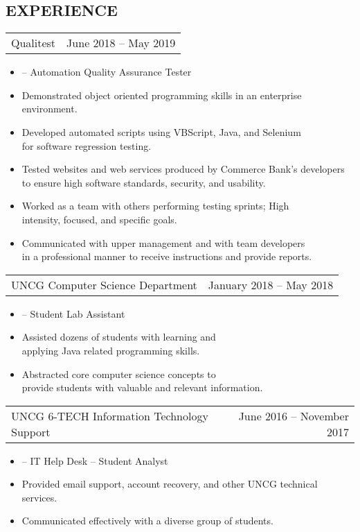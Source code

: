 \documentclass[overlapped,centered]{res}
\begin{document}
\begin{resume}
\section{EXPERIENCE}
		\begin{tabular}{p{3in}r}
		Qualitest & June 2018 -- May 2019
		\end{tabular}
		\begin{itemize}
		\item[] -- Automation Quality Assurance Tester
		\item[] Demonstrated object oriented programming skills in an enterprise \\ environment.
		\item[] Developed automated scripts using VBScript, Java, and Selenium \\ for software regression testing.
		\item[] Tested websites and web services produced by Commerce Bank's developers \\ to ensure high software standards, security, and usability.
		\item[] Worked as a team with others performing testing sprints; High \\ intensity, focused, and specific goals.
		\item[] Communicated with upper management and with team developers \\ in a professional manner to receive instructions and provide reports.
		\end{itemize}

		 \begin{tabular}{p{3in} r}
                  UNCG Computer Science Department &  January 2018 -- May 2018
                 \end{tabular}
		 \begin{itemize}
		\item[] -- Student Lab Assistant
                \item[] Assisted dozens of students with learning and \\ applying Java related programming skills.
		\item[] Abstracted core computer science concepts to \\ provide students with  valuable and relevant information.
                \end{itemize}

                \begin{tabular}{p{3in} r}
                UNCG 6-TECH Information Technology Support & June 2016 -- November 2017
                \end{tabular}
                \begin{itemize}
		\item[] -- IT Help Desk -- Student Analyst
                \item[] Provided email support, account recovery, and other UNCG technical services.
		\item[] Communicated effectively with a diverse group of students.
		 \end{itemize}





\end{resume}
\end{document}
